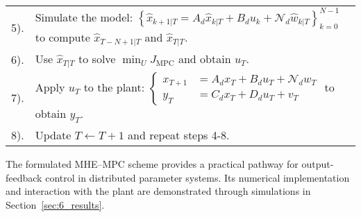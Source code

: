 \begin{table}[htbp]
\begin{tabular}{@{}p{}p{}@{}}
5). & Simulate the model: $\left\{ \hat{x}_{k+1|T} = A_d \hat{x}_{k|T} + B_d u_k + \mathcal{N}_d \hat{w}_{k|T} \right\}_{k=0}^{N-1}$
    to compute $\hat{x}_{T-N+1|T}$ and $\hat{x}_{T|T}$. \\

6). & Use $\hat{x}_{T|T}$ to solve $\min_{U} J_{\mathrm{MPC}}$ and obtain $u_T$. \\

7). & Apply $u_T$ to the plant: $\left\{ \begin{array}{ll}
x_{T+1} &= A_d x_T + B_d u_T + \mathcal{N}_d w_T \\
y_T &= C_d x_T + D_d u_T + v_T
\end{array} \right.$ to obtain $y_T$. \\

8). & Update $T \leftarrow T + 1$ and repeat steps 4-8. \\

\hline\hline
\end{tabular}
\end{table}

The formulated MHE--MPC scheme provides a practical pathway for output-feedback control in distributed parameter systems. Its numerical implementation and interaction with the plant are demonstrated through simulations in Section~\ref{sec:6_results}.

